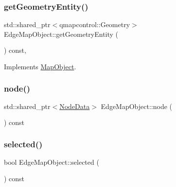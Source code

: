 \subsubsection{\texorpdfstring{getGeometryEntity()}{getGeometryEntity()}}
{\footnotesize\ttfamily std\+::shared\+\_\+ptr$<$qmapcontrol\+::\+Geometry$>$ Edge\+Map\+Object\+::get\+Geometry\+Entity (\begin{DoxyParamCaption}{ }\end{DoxyParamCaption}) const\hspace{0.3cm}{\ttfamily [inline]}, {\ttfamily [virtual]}}



Implements \mbox{\hyperlink{class_map_object_a82e055e41c862ec8d80d5bfb137b3253}{Map\+Object}}.

\mbox{\label{class_edge_map_object_a7a50daac2d1455401e49d69db3cac61e}} 
\subsubsection{\texorpdfstring{node()}{node()}}
{\footnotesize\ttfamily std\+::shared\+\_\+ptr$<$\mbox{\hyperlink{class_node_data}{Node\+Data}}$>$ Edge\+Map\+Object\+::node (\begin{DoxyParamCaption}{ }\end{DoxyParamCaption}) const\hspace{0.3cm}{\ttfamily [inline]}}

\mbox{\label{class_edge_map_object_a4489e116b68b86423a0a9df62b682c17}} 
\subsubsection{\texorpdfstring{selected()}{selected()}}
{\footnotesize\ttfamily bool Edge\+Map\+Object\+::selected (\begin{DoxyParamCaption}{ }\end{DoxyParamCaption}) const\hspace{0.3cm}{\ttfamily [inline]}}

\mbox{\label{class_edge_map_object_a471bebfdb702d8438d34c89a3158183f}} 
